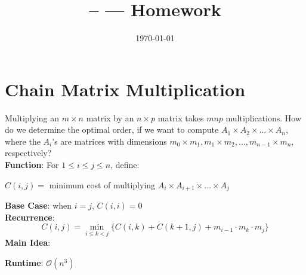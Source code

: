 \documentclass[11pt]{article}
\title{\Class-- \Session --- Homework \Homework}
\author{\Name}
\date{\today}
\def\mi{\textbf{Main Idea}: }
\def\rt{\textbf{Runtime}: }
\def\ft{\textbf{Function}: }
\def\bc{\textbf{Base Case}: }
\def\rc{\textbf{Recurrence}: }
\begin{document}
	\maketitle
	\section*{Chain Matrix Multiplication}
	Multiplying an $m \times n$ matrix by an $n \times p$ matrix takes $mnp$ multiplications. How do we determine the optimal order, if we want to compute $A_1 \times A_2 \times \dots \times A_n$, where the $A_i$’s are matrices with dimensions $m_0 \times m_1, m_1 \times m_2,\dots, m_{n-1} \times m_n$, respectively? \\
	\ft For $1\leq i \leq j\leq n$, define:
	\begin{center}
		$C(i, j) = $ minimum cost of multiplying $A_i \times A_{i+1} \times \dots \times A_j$
	\end{center}
	\bc when $i = j$, $C(i, i) = 0$\\
	\rc 
	$$C(i, j) = \min_{i \leq k < j}\{C(i, k) + C(k+1, j) + m_{i-1}\cdot m_k\cdot m_j\}$$
	\mi \\
	\begin{algorithm}[H]
	\end{algorithm}

	\rt $\mathcal{O}(n^3)$
\end{document}

